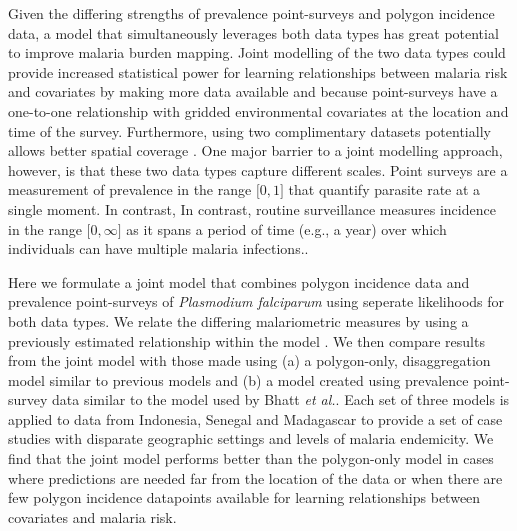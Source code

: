 \documentclass[10pt,letterpaper]{article}
\begin{document}
Given the differing strengths of prevalence point-surveys and polygon incidence data, a model that simultaneously leverages both data types has great potential to improve malaria burden mapping.
Joint modelling of the two data types could provide increased statistical power for learning relationships between malaria risk and covariates by making more data available and because point-surveys have a one-to-one relationship with gridded environmental covariates at the location and time of the survey.
Furthermore, using two complimentary datasets potentially allows better spatial coverage \cite{sturrock2016mapping}. 
One major barrier to a joint modelling approach, however, is that these two data types capture different scales.
Point surveys are a measurement of prevalence in the range $\lbrack 0, 1\rbrack$ that quantify parasite rate at a single moment. In contrast,
In contrast, routine surveillance measures incidence in the range $\lbrack 0, \infty\rbrack$ as it spans a period of time (e.g., a year) over which individuals can have multiple malaria infections..


Here we formulate a joint model that combines polygon incidence data and prevalence point-surveys of \emph{Plasmodium falciparum} using seperate likelihoods for both data types.
We relate the differing malariometric measures by using a previously estimated relationship within the model \cite{cameron2015defining}.
We then compare results from the joint model with those made using (a) a polygon-only, disaggregation model similar to previous models \cite{sturrock2014fine, wilson2017pointless} and (b) a model created using prevalence point-survey data similar to the model used by Bhatt \emph{et al.}\cite{bhatt2015effect}.
Each set of three models is applied to data from Indonesia, Senegal and Madagascar to provide a set of case studies with disparate geographic settings and levels of malaria endemicity.
We find that the joint model performs better than the polygon-only model in cases where predictions are needed far from the location of the data or when there are few polygon incidence datapoints available for learning relationships between covariates and malaria risk.

\end{document}
